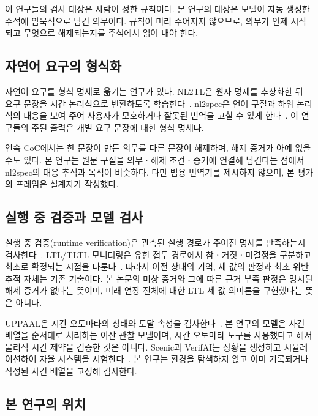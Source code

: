 \begin{revision}
이 연구들의 검사 대상은 사람이 정한 규칙이다. 본 연구의 대상은 모델이 자동 생성한 주석에 암묵적으로 담긴 의무이다. 규칙이 미리 주어지지 않으므로, 의무가 언제 시작되고 무엇으로 해제되는지를 주석에서 읽어 내야 한다.

\subsection{자연어 요구의 형식화}
\label{sec:related-nl}

자연어 요구를 형식 명세로 옮기는 연구가 있다. NL2TL은 원자 명제를 추상화한 뒤 요구 문장을 시간 논리식으로 변환하도록 학습한다~\cite{chen2023nl2tl}. nl2spec은 언어 구절과 하위 논리식의 대응을 보여 주어 사용자가 모호하거나 잘못된 번역을 고칠 수 있게 한다~\cite{cosler2023nl2spec}. 이 연구들의 주된 출력은 개별 요구 문장에 대한 형식 명세다.

연속 CoC에서는 한 문장이 만든 의무를 다른 문장이 해제하며, 해제 증거가 아예 없을 수도 있다. 본 연구는 원문 구절을 의무ㆍ해제 조건ㆍ증거에 연결해 남긴다는 점에서 nl2spec의 대응 추적과 목적이 비슷하다. 다만 범용 번역기를 제시하지 않으며, 본 평가의 프레임은 설계자가 작성했다.

\subsection{실행 중 검증과 모델 검사}
\label{sec:related-rv}

실행 중 검증(runtime verification)은 관측된 실행 경로가 주어진 명세를 만족하는지 검사한다~\cite{leucker2009runtime}. LTL/TLTL 모니터링은 유한 접두 경로에서 참ㆍ거짓ㆍ미결정을 구분하고 최초로 확정되는 시점을 다룬다~\cite{bauer2011runtime}. 따라서 이전 상태의 기억, 세 값의 판정과 최초 위반 추적 자체는 기존 기술이다. 본 논문의 미상 증거와 그에 따른 근거 부족 판정은 명시된 해제 증거가 없다는 뜻이며, 미래 연장 전체에 대한 LTL 세 값 의미론을 구현했다는 뜻은 아니다.

UPPAAL은 시간 오토마타의 상태와 도달 속성을 검사한다~\cite{behrmann2004uppaal,uppaalqueries}. 본 연구의 모델은 사건 배열을 순서대로 처리하는 이산 관찰 모델이며, 시간 오토마타 도구를 사용했다고 해서 물리적 시간 제약을 검증한 것은 아니다. Scenic과 VerifAI는 상황을 생성하고 시뮬레이션하여 자율 시스템을 시험한다~\cite{fremont2019scenic,dreossi2019verifai}. 본 연구는 환경을 탐색하지 않고 이미 기록되거나 작성된 사건 배열을 고정해 검사한다.

\subsection{본 연구의 위치}
\label{sec:related-position}


\end{revision}
